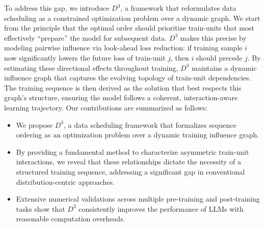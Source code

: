 To address this gap, we introduce $D^3$, a framework that reformulates data scheduling as a constrained optimization problem over a dynamic graph. We start from the principle that the optimal order should prioritize train-units that most effectively “prepare” the model for subsequent data. $D^3$ makes this precise by modeling pairwise influence via look-ahead loss reduction: if training sample $i$ now significantly lowers the future loss of train-unit $j$, then $i$ should precede $j$. By estimating these directional effects throughout training, $D^3$ maintains a dynamic influence graph that captures the evolving topology of train-unit dependencies. The training sequence is then derived as the solution that best respects this graph’s structure, ensuring the model follows a coherent, interaction-aware learning trajectory. Our contributions are summarized as follows:  
\begin{itemize}
    \item We propose $D^3$, a data scheduling framework that formalizes sequence ordering as an optimization problem over a dynamic training influence graph.
    \item By providing a fundamental method to characterize asymmetric train-unit interactions, we reveal that these relationships dictate the necessity of a structured training sequence, addressing a significant gap in conventional distribution-centric approaches.
    \item Extensive numerical validations across multiple pre-training and post-training tasks show that $D^3$ consistently improves the performance of LLMs with reasonable computation overheads. 
\end{itemize}